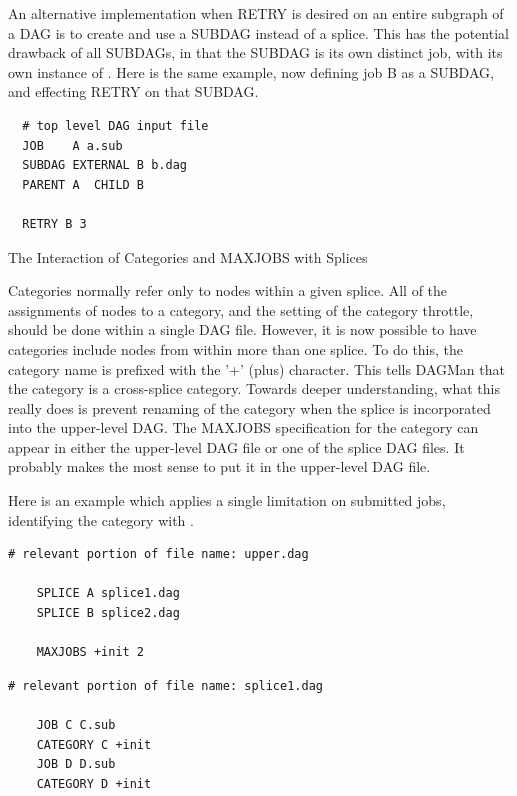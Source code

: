 An alternative implementation when RETRY is desired on an
entire subgraph of a DAG is to create and use a SUBDAG
instead of a splice.
This has the potential drawback of all SUBDAGs,
in that the SUBDAG is its own distinct job,
with its own instance of .
Here is the same example, now defining job B as a SUBDAG,
and effecting RETRY on that SUBDAG.
\begin{verbatim}
  # top level DAG input file
  JOB    A a.sub
  SUBDAG EXTERNAL B b.dag
  PARENT A  CHILD B

  RETRY B 3
\end{verbatim}

\begin{description}
\item[The Interaction of Categories and MAXJOBS with Splices]
\end{description}

Categories normally refer only to nodes within a
given splice.
All of the assignments of nodes to a category, and the
setting of the category throttle, should be done within a single DAG file.
However, it is now possible to have categories include nodes
from within more than one splice.
To do this, the category name is prefixed with the '+' (plus) character.
This tells DAGMan that the category is
a cross-splice category.
Towards deeper understanding,
what this really does is prevent renaming
of the category when the splice is incorporated into the upper-level DAG.
The MAXJOBS specification for the category can appear in either the
upper-level DAG file or one of the splice DAG files.
It probably
makes the most sense to put it in the upper-level DAG file.

Here is an example which applies a single limitation on submitted jobs,
identifying the category with . 

\begin{verbatim}
# relevant portion of file name: upper.dag

    SPLICE A splice1.dag
    SPLICE B splice2.dag

    MAXJOBS +init 2
\end{verbatim}

\begin{verbatim}
# relevant portion of file name: splice1.dag

    JOB C C.sub
    CATEGORY C +init
    JOB D D.sub
    CATEGORY D +init

\end{verbatim}

